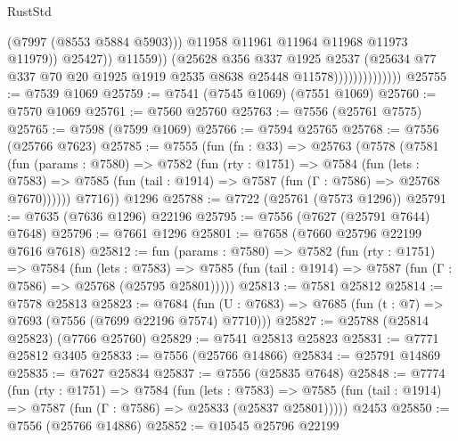 \begin{lexlean}{RustStd}
\begin{coremodule}
                                          (@7997 (@8553 @5884 @5903)))
                                        @11958
                                        @11961
                                        @11964
                                        @11968
                                        @11973
                                        @11979))
                                    @25427))
                                @11559))
                            (@25628
                              @356
                              @337
                              @1925
                              @2537
                              (@25634
                                @77
                                @337
                                @70
                                @20
                                @1925
                                @1919
                                @2535
                                @8638
                                @25448
                                @11578))))))))))))))
@25755 := @7539 @1069
@25759 := @7541 (@7545 @1069) (@7551 @1069)
@25760 := @7570 @1069
@25761 := @7560 @25760
@25763 := @7556 (@25761 @7575)
@25765 := @7598 (@7599 @1069)
@25766 := @7594 @25765
@25768 := @7556 (@25766 @7623)
@25785 := @7555
    (fun (fn : @33) =>
    @25763
      (@7578
        (@7581
          (fun (params : @7580) =>
          @7582
            (fun (rty : @1751) =>
            @7584
              (fun (lets : @7583) =>
              @7585 (fun (tail : @1914) => @7587 (fun (Γ : @7586) => @25768 @7670))))))
        @7716))
    @1296
@25788 := @7722 (@25761 (@7573 @1296))
@25791 := @7635 (@7636 @1296) @22196
@25795 := @7556 (@7627 (@25791 @7644) @7648)
@25796 := @7661 @1296
@25801 := @7658 (@7660 @25796 @22199 @7616 @7618)
@25812 := fun (params : @7580) =>
  @7582
    (fun (rty : @1751) =>
    @7584
      (fun (lets : @7583) =>
      @7585 (fun (tail : @1914) => @7587 (fun (Γ : @7586) => @25768 (@25795 @25801)))))
@25813 := @7581 @25812
@25814 := @7578 @25813
@25823 := @7684
    (fun (U : @7683) => @7685 (fun (t : @7) => @7693 (@7556 (@7699 @22196 @7574) @7710)))
@25827 := @25788 (@25814 @25823) (@7766 @25760)
@25829 := @7541 @25813 @25823
@25831 := @7771 @25812 @3405
@25833 := @7556 (@25766 @14866)
@25834 := @25791 @14869
@25835 := @7627 @25834
@25837 := @7556 (@25835 @7648)
@25848 := @7774
    (fun (rty : @1751) =>
    @7584
      (fun (lets : @7583) =>
      @7585 (fun (tail : @1914) => @7587 (fun (Γ : @7586) => @25833 (@25837 @25801)))))
    @2453
@25850 := @7556 (@25766 @14886)
@25852 := @10545 @25796 @22199

\end{coremodule}
\end{lexlean}
